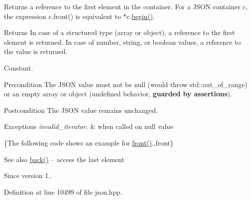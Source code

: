 Returns a reference to the first element in the container. For a J\+S\+ON container {\ttfamily c}, the expression {\ttfamily c.\+front()} is equivalent to {\ttfamily $\ast$c.\hyperlink{classnlohmann_1_1basic__json_a0ff28dac23f2bdecee9564d07f51dcdc}{begin()}}.

\begin{DoxyReturn}{Returns}
In case of a structured type (array or object), a reference to the first element is returned. In case of number, string, or boolean values, a reference to the value is returned.
\end{DoxyReturn}
Constant.

\begin{DoxyPrecond}{Precondition}
The J\+S\+ON value must not be {\ttfamily null} (would throw {\ttfamily std\+::out\+\_\+of\+\_\+range}) or an empty array or object (undefined behavior, {\bfseries guarded by assertions}). 
\end{DoxyPrecond}
\begin{DoxyPostcond}{Postcondition}
The J\+S\+ON value remains unchanged.
\end{DoxyPostcond}

\begin{DoxyExceptions}{Exceptions}
{\em invalid\+\_\+iterator.} & when called on {\ttfamily null} value\\
\hline
\end{DoxyExceptions}
\{The following code shows an example for {\ttfamily \hyperlink{classnlohmann_1_1basic__json_a3acba9c6ceb7214e565fe08c3ba5b352}{front()}}.,front\}

\begin{DoxySeeAlso}{See also}
\hyperlink{classnlohmann_1_1basic__json_a011397134847f36db0ed7d7a93753677}{back()} -- access the last element
\end{DoxySeeAlso}
\begin{DoxySince}{Since}
version 1.. 
\end{DoxySince}


Definition at line 10499 of file json.\+hpp.


